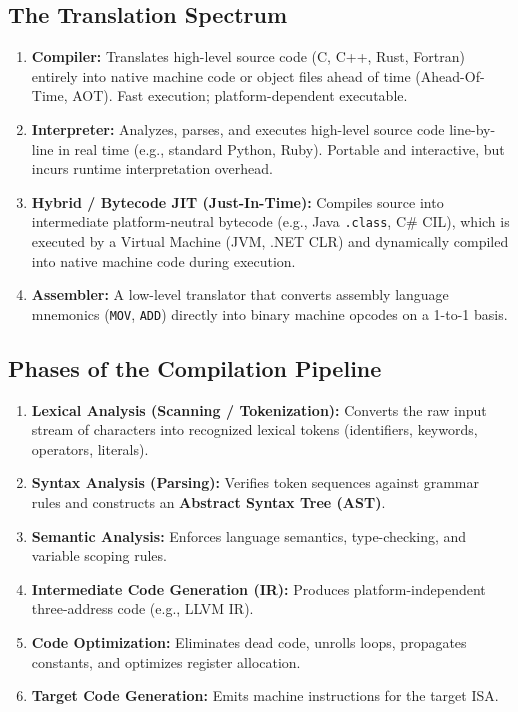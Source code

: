 \subsection{The Translation Spectrum}
\begin{enumerate}[label=\bfseries\arabic*.]
    \item \textbf{Compiler:} Translates high-level source code (C, C++, Rust, Fortran) entirely into native machine code or object files ahead of time (Ahead-Of-Time, AOT). Fast execution; platform-dependent executable.
    \item \textbf{Interpreter:} Analyzes, parses, and executes high-level source code line-by-line in real time (e.g., standard Python, Ruby). Portable and interactive, but incurs runtime interpretation overhead.
    \item \textbf{Hybrid / Bytecode JIT (Just-In-Time):} Compiles source into intermediate platform-neutral bytecode (e.g., Java \texttt{.class}, C\# CIL), which is executed by a Virtual Machine (JVM, .NET CLR) and dynamically compiled into native machine code during execution.
    \item \textbf{Assembler:} A low-level translator that converts assembly language mnemonics (\texttt{MOV}, \texttt{ADD}) directly into binary machine opcodes on a 1-to-1 basis.
\end{enumerate}

\subsection{Phases of the Compilation Pipeline}
\begin{enumerate}[label=\bfseries\arabic*.]
    \item \textbf{Lexical Analysis (Scanning / Tokenization):} Converts the raw input stream of characters into recognized lexical tokens (identifiers, keywords, operators, literals).
    \item \textbf{Syntax Analysis (Parsing):} Verifies token sequences against grammar rules and constructs an \textbf{Abstract Syntax Tree (AST)}.
    \item \textbf{Semantic Analysis:} Enforces language semantics, type-checking, and variable scoping rules.
    \item \textbf{Intermediate Code Generation (IR):} Produces platform-independent three-address code (e.g., LLVM IR).
    \item \textbf{Code Optimization:} Eliminates dead code, unrolls loops, propagates constants, and optimizes register allocation.
    \item \textbf{Target Code Generation:} Emits machine instructions for the target ISA.
\end{enumerate}

